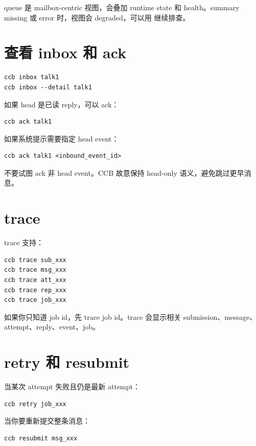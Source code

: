 queue 是 mailbox-centric 视图，会叠加 runtime state 和 health。summary missing 或 error 时，视图会 degraded，可以用  继续排查。

\section{查看 inbox 和 ack}

\begin{lstlisting}
ccb inbox talk1
ccb inbox --detail talk1
\end{lstlisting}

如果 head 是已读 reply，可以 ack：

\begin{lstlisting}
ccb ack talk1
\end{lstlisting}

如果系统提示需要指定 head event：

\begin{lstlisting}
ccb ack talk1 <inbound_event_id>
\end{lstlisting}

不要试图 ack 非 head event。CCB 故意保持 head-only 语义，避免跳过更早消息。

\section{trace}

trace 支持：

\begin{lstlisting}
ccb trace sub_xxx
ccb trace msg_xxx
ccb trace att_xxx
ccb trace rep_xxx
ccb trace job_xxx
\end{lstlisting}

如果你只知道 job id，先 trace job id。trace 会显示相关 submission、message、attempt、reply、event、job。

\section{retry 和 resubmit}

当某次 attempt 失败且仍是最新 attempt：

\begin{lstlisting}
ccb retry job_xxx
\end{lstlisting}

当你要重新提交整条消息：

\begin{lstlisting}
ccb resubmit msg_xxx
\end{lstlisting}

